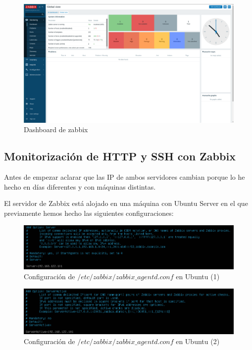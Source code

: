 \begin{figure}[H]
	\centering
	\includegraphics[scale=0.28]{graphics/img12}
	\caption{Dashboard de zabbix}
\end{figure}

\newpage
\subsection{Monitorización de HTTP y SSH con Zabbix}

Antes de empezar aclarar que las IP de ambos servidores cambian porque lo he hecho en días diferentes y con máquinas distintas.

El servidor de Zabbix está alojado en una máquina con Ubuntu Server en el que previamente hemos hecho las siguientes configuraciones:

\begin{figure}[H]
	\centering
	\includegraphics[scale=0.5]{graphics/img20}
	\caption{Configuración de $/etc/zabbix/zabbix\_agentd.conf$ en Ubuntu (1)}
\end{figure}

\begin{figure}[H]
	\centering
	\includegraphics[scale=0.5]{graphics/img21}
	\caption{Configuración de $/etc/zabbix/zabbix\_agentd.conf$ en Ubuntu (2)}
\end{figure}

